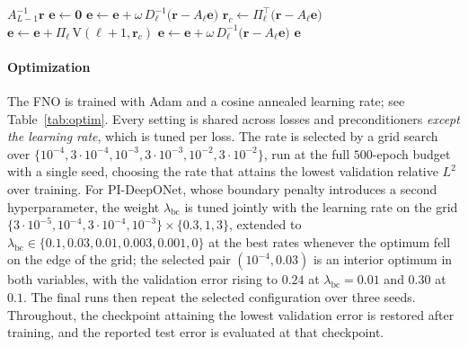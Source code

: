 \documentclass{article} %
\begin{document}
\begin{algorithm}[htb]
   \caption{V-cycle $\mathrm{V}(\ell,\mathbf r)$ on level $\ell$; the preconditioner is $P\mathbf r := \mathrm{V}(0,\mathbf r)$. Here $D_\ell = \operatorname{diag}(A_\ell)$.}
   \label{alg:vcycle}
   \begin{algorithmic}[1]
         \State \Return $A_{L-1}^{-1}\mathbf r$ 
      \EndIf
      \State $\mathbf e \gets \mathbf 0$
         \State $\mathbf e \gets \mathbf e + \omega\, D_\ell^{-1}\big(\mathbf r - A_\ell \mathbf e\big)$ 
      \EndFor
      \State $\mathbf r_c \gets \Pi_\ell^\top\big(\mathbf r - A_\ell \mathbf e\big)$ 
      \State $\mathbf e \gets \mathbf e + \Pi_\ell\, \mathrm{V}(\ell+1, \mathbf r_c)$ 
         \State $\mathbf e \gets \mathbf e + \omega\, D_\ell^{-1}\big(\mathbf r - A_\ell \mathbf e\big)$ 
      \EndFor
      \State \Return $\mathbf e$
   \end{algorithmic}
\end{algorithm}

\paragraph{Optimization} The FNO is trained with Adam and a cosine annealed learning rate; see Table~\ref{tab:optim}. Every setting is shared across losses and preconditioners \emph{except the learning rate}, which is tuned per loss. The rate is selected by a grid search over $\{10^{-4}, 3\cdot 10^{-4}, 10^{-3}, 3\cdot 10^{-3}, 10^{-2}, 3\cdot 10^{-2}\}$, run at the full $500$-epoch budget with a single seed, choosing the rate that attains the lowest validation relative $L^2$ over training. For PI-DeepONet, whose boundary penalty introduces a second hyperparameter, the weight $\lambda_{\mathrm{bc}}$ is tuned jointly with the learning rate on the grid $\{3\cdot 10^{-5}, 10^{-4}, 3\cdot 10^{-4}, 10^{-3}\} \times \{0.3, 1, 3\}$, extended to $\lambda_{\mathrm{bc}} \in \{0.1, 0.03, 0.01, 0.003, 0.001, 0\}$ at the best rates whenever the optimum fell on the edge of the grid; the selected pair $(10^{-4}, 0.03)$ is an interior optimum in both variables, with the validation error rising to $0.24$ at $\lambda_{\mathrm{bc}}=0.01$ and $0.30$ at $0.1$. The final runs then repeat the selected configuration over three seeds. Throughout, the checkpoint attaining the lowest validation error is restored after training, and the reported test error is evaluated at that checkpoint.
\end{document}

